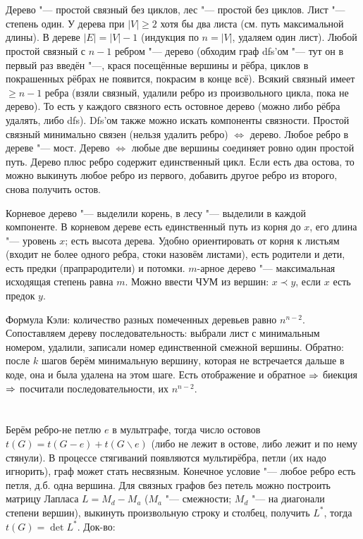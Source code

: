 \section{} %
Дерево "--- простой связный без циклов, лес "--- простой без циклов.
Лист "--- степень один.
У дерева при $|V|\ge 2$ хотя бы два листа (см. путь максимальной длины).
В дереве $|E|=|V|-1$ (индукция по $n=|V|$, удаляем один лист).
Любой простой связный с $n-1$ ребром "--- дерево (обходим граф dfs'ом "--- тут он в первый раз введён "---, крася посещённые вершины и рёбра, циклов в покрашенных
рёбрах не появится, покрасим в конце всё).
Всякий связный имеет $\ge n-1$ ребра (взяли связный, удалили ребро из произвольного цикла, пока не дерево).
То есть у каждого связного есть остовное дерево (можно либо рёбра удалять, либо dfs).
Dfs'ом также можно искать компоненты связности.
Простой связный минимально связен (нельзя удалить ребро) $\iff$ дерево.
Любое ребро в дереве "--- мост.
Дерево $\iff$ любые две вершины соединяет ровно один простой путь.
Дерево плюс ребро содержит единственный цикл.
Если есть два остова, то можно выкинуть любое ребро из первого, добавить другое ребро из второго, снова получить остов.

Корневое дерево "--- выделили корень, в лесу "--- выделили в каждой компоненте.
В корневом дереве есть единственный путь из корня до $x$, его длина "--- уровень $x$;
есть высота дерева.
Удобно ориентировать от корня к листьям (входит не более одного ребра, стоки назовём листами),
есть родители и дети, есть предки (прапрародители) и потомки.
$m$-арное дерево "--- максимальная исходящая степень равна $m$.
Можно ввести ЧУМ из вершин: $x \prec y$, если $x$ есть предок $y$.

Формула Кэли: количество разных помеченных деревьев равно $n^{n-2}$.
Сопоставляем дереву последовательность: выбрали лист с минимальным номером, удалили,
записали номер единственной смежной вершины.
Обратно: после $k$ шагов берём минимальную вершину, которая не встречается дальше в коде, она и была
удалена на этом шаге.
Есть отображение и обратное $\Rightarrow$ биекция $\Rightarrow$ посчитали последовательности, их $n^{n-2}$.

\section{} %
Берём ребро-не петлю $e$ в мультграфе, тогда число остовов $t(G)=t(G-e)+t(G\backslash e)$ (либо не лежит в остове, либо лежит и по нему стянули).
В процессе стягиваний появляются мультирёбра, петли (их надо игнорить), граф может стать несвязным.
Конечное условие "--- любое ребро есть петля, д.б. одна вершина.
Для связных графов без петель можно построить матрицу Лапласа $L=M_d-M_a$ ($M_a$ "--- смежности; $M_d$ "--- на диагонали степени вершин),
выкинуть произвольную строку и столбец, получить $L^*$, тогда $t(G)=\det L^*$.
Док-во:


